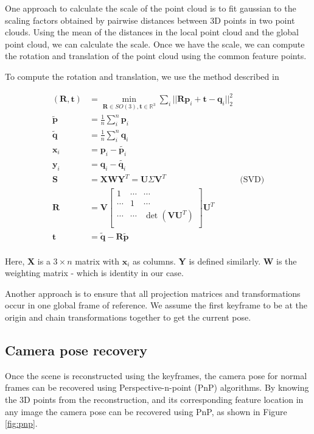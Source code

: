 \documentclass{article}
\begin{document}
One approach to calculate the scale of the point cloud is to fit gaussian to the scaling factors obtained by pairwise distances between 3D points in two point clouds. Using the mean of the distances in the local point cloud and the global point cloud, we can calculate the scale. Once we have the scale, we can compute the rotation and translation of the point cloud using the common feature points.

To compute the rotation and translation, we use the method described in \citep{rigid}

\begin{align*}
    (\textbf{R}, \textbf{t}) &= \min_{\textbf{R} \in SO(3), \textbf{t} \in \mathbb{R}^{3}} \sum_i || \textbf{Rp}_i + \textbf{t} - \textbf{q}_i||^{2}_{2}\\
    \tilde{\textbf{p}} &= \frac{1}{n} \sum_i^{n} \textbf{p}_i\\
    \tilde{\textbf{q}} &= \frac{1}{n} \sum_i^{n} \textbf{q}_i\\
    \textbf{x}_i &= \textbf{p}_i - \tilde{\textbf{p}_i}\\
    \textbf{y}_i &= \textbf{q}_i - \tilde{\textbf{q}_i}\\
    \textbf{S} &= \textbf{XWY}^{T} = \textbf{U}\Sigma\textbf{V}^{T} & \text{(SVD)}\\
    \textbf{R} &= \textbf{V} \begin{bmatrix}
        1 & \cdots & \cdots\\
        \cdots & 1 & \cdots\\
        \cdots & \cdots & \det(\textbf{VU}^{T})\\
    \end{bmatrix} \textbf{U}^{T}\\
    \textbf{t} &= \tilde{\textbf{q}} - \textbf{R}\tilde{\textbf{p}}\\
\end{align*}

Here, \textbf{X} is a $3\times n$ matrix with $\textbf{x}_i$ as columns. \textbf{Y} is defined similarly. \textbf{W} is the weighting matrix - which is identity in our case.

Another approach is to ensure that all projection matrices and transformations occur in one global frame of reference. We assume the first keyframe to be at the origin and chain transformations together to get the current pose.

\subsection{Camera pose recovery}
Once the scene is reconstructed using the keyframes, the camera pose for normal frames can be recovered using Perspective-n-point (PnP) algorithms. By knowing the 3D points from the reconstruction, and its corresponding feature location in any image the camera pose can be recovered using PnP, as shown in Figure \ref{fig:pnp}.
\end{document}
